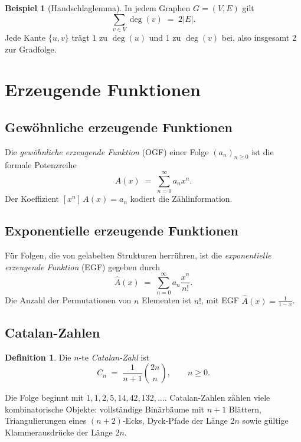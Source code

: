 \documentclass[12pt,a4paper]{amsart}
\theoremstyle{definition}
\newtheorem{definition}[theorem]{Definition}
\newtheorem{example}[theorem]{Beispiel}
\theoremstyle{remark}
\begin{document}
\begin{example}[Handschlaglemma]
In jedem Graphen $G = (V,E)$ gilt
\[
  \sum_{v \in V} \deg(v) \;=\; 2|E|.
\]
Jede Kante $\{u,v\}$ tr\"agt $1$ zu $\deg(u)$ und $1$ zu $\deg(v)$ bei,
also insgesamt $2$ zur Gradfolge.
\end{example}

\section{Erzeugende Funktionen}

\subsection{Gew\"ohnliche erzeugende Funktionen}

Die \emph{gew\"ohnliche erzeugende Funktion} (OGF) einer Folge $(a_n)_{n\ge 0}$
ist die formale Potenzreihe
\[
  A(x) \;=\; \sum_{n=0}^{\infty} a_n x^n.
\]
Der Koeffizient $[x^n]\,A(x) = a_n$ kodiert die Z\"ahlinformation.

\subsection{Exponentielle erzeugende Funktionen}

F\"ur Folgen, die von gelabelten Strukturen herr\"uhren, ist die \emph{exponentielle
erzeugende Funktion} (EGF) gegeben durch
\[
  \hat{A}(x) \;=\; \sum_{n=0}^{\infty} a_n \frac{x^n}{n!}.
\]
Die Anzahl der Permutationen von $n$ Elementen ist $n!$, mit EGF
$\hat{A}(x) = \frac{1}{1-x}$.

\subsection{Catalan-Zahlen}

\begin{definition}
Die $n$-te \emph{Catalan-Zahl} ist
\[
  C_n \;=\; \frac{1}{n+1}\binom{2n}{n}, \qquad n \ge 0.
\]
\end{definition}

Die Folge beginnt mit $1, 1, 2, 5, 14, 42, 132, \ldots$.  Catalan-Zahlen z\"ahlen
viele kombinatorische Objekte: vollst\"andige Bin\"arb\"aume mit $n+1$ Bl\"attern,
Triangulierungen eines $(n+2)$-Ecks, Dyck-Pfade der L\"ange $2n$ sowie g\"ultige
Klammerausdr\"ucke der L\"ange $2n$.
\end{document}
